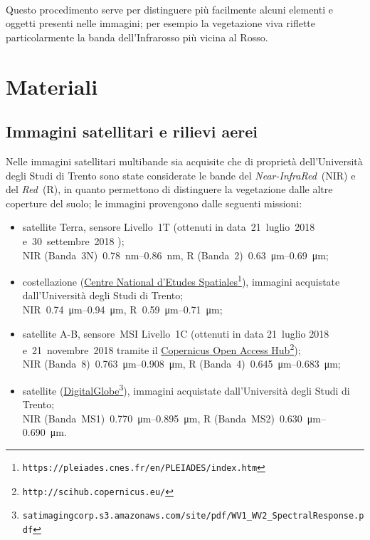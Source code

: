 %
\\
Questo procedimento serve per distinguere più facilmente alcuni elementi e oggetti presenti nelle immagini; per esempio la vegetazione viva riflette particolarmente la banda dell'Infrarosso più vicina al Rosso.



\section{Materiali}
\subsection{Immagini satellitari e rilievi aerei}
Nelle immagini satellitari multibande sia acquisite che di proprietà dell'Università degli Studi di Trento sono state considerate le bande del \emph{Near-InfraRed}~(NIR) e del \emph{Red}~(R), in quanto permettono di distinguere la vegetazione dalle altre coperture del suolo;
le immagini provengono dalle seguenti missioni:
%
\begin{itemize}
	\item satellite Terra, sensore \AST{} Livello~1T (ottenuti in data~21~luglio~2018 e~30~settembre~2018 );  
		\\
		NIR (Banda~3N)~\SIrange[range-phrase={-}]{0.78}{0.86}{\nano\m}, R (Banda~2)~\SIrange[range-phrase={-}]{0.63}{0.69}{\micro\m};
	\item costellazione \Pl{} (\href{https://pleiades.cnes.fr/en/PLEIADES/index.htm}{Centre National d'Etudes Spatiales}\footnote{\texttt{https://pleiades.cnes.fr/en/PLEIADES/index.htm}}), immagini acquistate dall'Università degli Studi di Trento; 
		\\
		NIR~\SIrange[range-phrase={-}]{0.74}{0.94}{\micro\m}, R~\SIrange[range-phrase={-}]{0.59}{0.71}{\micro\m};
	\item satellite \Se{}A-B, sensore~MSI Livello~1C (ottenuti in data 21~luglio 2018 e~21~novembre~2018 tramite il \href{http://scihub.copernicus.eu/}{Copernicus Open Access Hub}\footnote{\texttt{http://scihub.copernicus.eu/}});
		\\
		NIR (Banda~8)~\SIrange[range-phrase={-}]{0.763}{0.908}{\micro\m}, R (Banda~4)~\SIrange[range-phrase={-}]{0.645}{0.683}{\micro\m};
	\item satellite \WV{} (\href{satimagingcorp.s3.amazonaws.com/site/pdf/WV1\_{}WV2\_{}SpectralResponse.pdf}{DigitalGlobe}\footnote{\texttt{satimagingcorp.s3.amazonaws.com/site/pdf/WV1\_{}WV2\_{}SpectralResponse.pdf}}), immagini acquistate dall'Università degli Studi di Trento;
		\\
		NIR (Banda~MS1)~\SIrange[range-phrase={-}]{0.770}{0.895}{\micro\m}, R (Banda~MS2)~\SIrange[range-phrase={-}]{0.630}{0.690}{\micro\m}.
\end{itemize}
